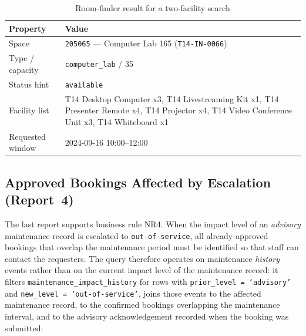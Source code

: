 \begin{table}[htbp]
    \centering
    \small
    \begin{tabularx}{\textwidth}{X X}
        \toprule
        \textbf{Property} & \textbf{Value} \\
        \midrule
        Space & \texttt{205065} --- Computer Lab 165 (\texttt{T14-IN-0066}) \\
        Type / capacity & \texttt{computer\_lab} / 35 \\
        Status hint & \texttt{available} \\
        Facility list & T14 Desktop Computer x3, T14 Livestreaming Kit x1,
        T14 Presenter Remote x4, T14 Projector x4, T14 Video Conference Unit
        x3, T14 Whiteboard x1 \\
        Requested window & 2024-09-16 10:00--12:00 \\
        \bottomrule
    \end{tabularx}
    \caption{Room-finder result for a two-facility search}
    \label{tab:aq-q2}
\end{table}

\subsection{Approved Bookings Affected by Escalation (Report~4)}

The last report supports business rule NR4. When the impact level of an
\emph{advisory} maintenance record is escalated to \texttt{out-of-service},
all already-approved bookings that overlap the maintenance period must be
identified so that staff can contact the requesters. The query therefore
operates on maintenance \emph{history} events rather than on the current
impact level of the maintenance record: it filters
\texttt{maintenance\_impact\_history} for rows with
\texttt{prior\_level = `advisory'} and \texttt{new\_level =
`out-of-service'}, joins those events to the affected maintenance record, to
the confirmed bookings overlapping the maintenance interval, and to the
advisory acknowledgement recorded when the booking was submitted:

